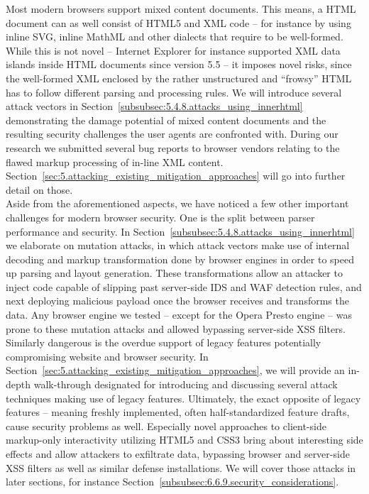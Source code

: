     Most modern browsers support mixed content documents. This means, a HTML document can as well consist of HTML5 and XML code -- for instance by using inline SVG, inline MathML and other dialects that require to be well-formed. While this is not novel -- Internet Explorer for instance supported XML data islands inside HTML documents since version 5.5 -- it imposes novel risks, since the well-formed XML enclosed by the rather unstructured and ``frowsy'' HTML has to follow different parsing and processing rules. We will introduce several attack vectors in Section~\ref{subsubsec:5.4.8.attacks_using_innerhtml} demonstrating the damage potential of mixed content documents and the resulting security challenges the user agents are confronted with. During our research we submitted several bug reports to browser vendors relating to the flawed markup processing of in-line XML content. Section~\ref{sec:5.attacking_existing_mitigation_approaches} will go into further detail on those.\\

    Aside from the aforementioned aspects, we have noticed a few other important challenges for modern browser security. One is the split between parser performance and security. In Section~\ref{subsubsec:5.4.8.attacks_using_innerhtml} we elaborate on mutation attacks, in which attack vectors make use of internal decoding and markup transformation done by browser engines in order to speed up parsing and layout generation. These transformations allow an attacker to inject code capable of slipping past server-side IDS and WAF detection rules, and next deploying malicious payload once the browser receives and transforms the data. Any browser engine we tested -- except for the Opera Presto engine -- was prone to these mutation attacks and allowed bypassing server-side XSS filters. Similarly dangerous is the overdue support of legacy features potentially compromising website and browser security. In Section~\ref{sec:5.attacking_existing_mitigation_approaches}, we will provide an in-depth walk-through designated 
for introducing and discussing several attack techniques making use of legacy features. Ultimately, the exact opposite of legacy features -- meaning freshly implemented, often half-standardized feature drafts, cause security problems as well. Especially novel approaches to client-side markup-only interactivity utilizing HTML5 and CSS3 bring about interesting side effects and allow attackers to exfiltrate data, bypassing browser and server-side XSS filters as well as similar defense installations. We will cover those attacks in later sections, for instance Section~\ref{subsubsec:6.6.9.security_considerations}.

  